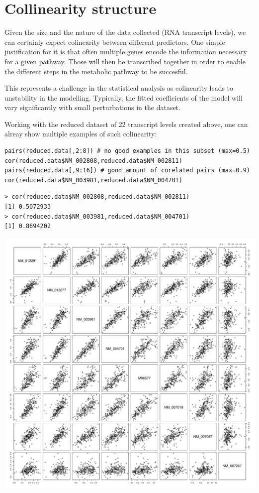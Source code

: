 \documentclass[11pt, a4paper]{article}
\begin{document}
\section{Collinearity structure}
\label{sec-3}

Given the size and the nature of the data collected (RNA transcript
levels), we can certainly expect colinearity between different
predictors. One simple justification for it is that often multiple
genes encode the information necessary for a given pathway. Those will
then be transcribed together in order to enable the different steps in
the metabolic pathway to be succesful. 

This represents a challenge in the statistical analysis as colinearity
leads to unstability in the modelling. Typically, the fitted
coefficients of the model will vary significantly with small
perturbations in the dataset.

Working with the reduced dataset of 22 transcript levels created
above, one can alreay show multiple examples of such colinearity:


\begin{verbatim}
pairs(reduced.data[,2:8]) # no good examples in this subset (max=0.5)
cor(reduced.data$NM_002808,reduced.data$NM_002811)
pairs(reduced.data[,9:16]) # good amount of corelated pairs (max=0.9)
cor(reduced.data$NM_003981,reduced.data$NM_004701)
\end{verbatim}


\begin{verbatim}
> cor(reduced.data$NM_002808,reduced.data$NM_002811)
[1] 0.5072933
> cor(reduced.data$NM_003981,reduced.data$NM_004701)
[1] 0.8694202
\end{verbatim}

\includegraphics[scale=0.4]{pairs-colinearity.pdf}
\end{document}
